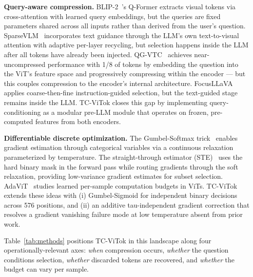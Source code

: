 \documentclass{article}
\begin{document}
\textbf{Query-aware compression.}
BLIP-2~\cite{li2023blip2}'s Q-Former extracts visual tokens via cross-attention with
learned query embeddings, but the queries are fixed parameters shared across all
inputs rather than derived from the user's question.
SparseVLM~\cite{zhang2025sparsevlm} incorporates text guidance through the LLM's own
text-to-visual attention with adaptive per-layer recycling, but selection happens inside
the LLM after all tokens have already been injected.
QG-VTC~\cite{li2025qgvtc} achieves near-uncompressed performance with 1/8 of tokens
by embedding the question into the ViT's feature space and progressively compressing
within the encoder — but this couples compression to the encoder's internal architecture.
FocusLLaVA~\cite{zhu2024focusllava} applies coarse-then-fine instruction-guided selection,
but the text-guided stage remains inside the LLM.
TC-ViTok closes this gap by implementing query-conditioning as a modular pre-LLM module
that operates on frozen, pre-computed features from both encoders.

\textbf{Differentiable discrete optimization.}
The Gumbel-Softmax trick~\cite{jang2017categorical, maddison2017concrete} enables
gradient estimation through categorical variables via a continuous relaxation parameterized
by temperature.
The straight-through estimator (STE)~\cite{bengio2013estimating} uses the hard binary
mask in the forward pass while routing gradients through the soft relaxation, providing
low-variance gradient estimates for subset selection.
AdaViT~\cite{meng2022adavit} studies learned per-sample computation budgets in ViTs.
TC-ViTok extends these ideas with (i) Gumbel-Sigmoid for independent binary decisions
across 576 positions, and (ii) an additive tau-independent gradient correction that
resolves a gradient vanishing failure mode at low temperature absent from prior work.

Table~\ref{tab:methods} positions TC-ViTok in this landscape along four
operationally-relevant axes: \emph{when} compression occurs, \emph{whether}
the question conditions selection, \emph{whether} discarded tokens are recovered,
and \emph{whether} the budget can vary per sample.
\end{document}
